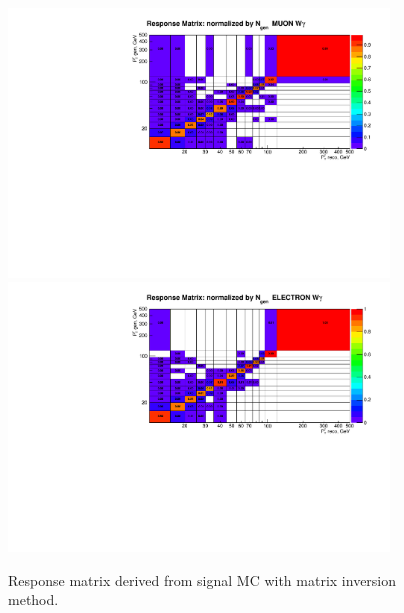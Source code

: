 \begin{figure}[htb]
  \begin{center}
   \includegraphics[width=0.90\textwidth]{../figs/figs_v11/MUON_WGamma/Constants/cResponseMatr_MUON_WGamma__yield_pm_stat.pdf}\\
\includegraphics[width=0.90\textwidth]{../figs/figs_v11/ELECTRON_WGamma/Constants/cResponseMatr_ELECTRON_WGamma__yield_pm_stat.pdf}
  \caption{Response matrix derived from signal MC with matrix inversion method.}
  \label{fig:respMatrices_Wg}
  \end{center}
\end{figure}

